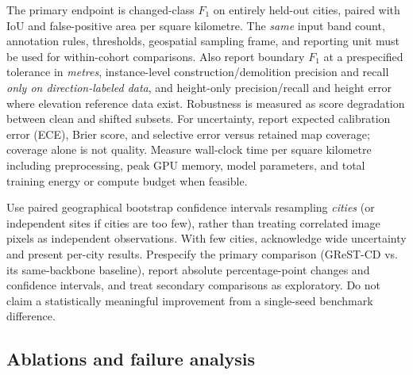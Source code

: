 \documentclass[11pt,a4paper]{article}
\begin{document}
The primary endpoint is changed-class $F_1$ on entirely held-out cities, paired with IoU and false-positive area per square kilometre. The \emph{same} input band count, annotation rules, thresholds, geospatial sampling frame, and reporting unit must be used for within-cohort comparisons. Also report boundary $F_1$ at a prespecified tolerance in \emph{metres}, instance-level construction/demolition precision and recall \emph{only on direction-labeled data}, and height-only precision/recall and height error where elevation reference data exist. Robustness is measured as score degradation between clean and shifted subsets. For uncertainty, report expected calibration error (ECE), Brier score, and selective error versus retained map coverage; coverage alone is not quality. Measure wall-clock time per square kilometre including preprocessing, peak GPU memory, model parameters, and total training energy or compute budget when feasible.

Use paired geographical bootstrap confidence intervals resampling \emph{cities} (or independent sites if cities are too few), rather than treating correlated image pixels as independent observations. With few cities, acknowledge wide uncertainty and present per-city results. Prespecify the primary comparison (GReST-CD vs. its same-backbone baseline), report absolute percentage-point changes and confidence intervals, and treat secondary comparisons as exploratory. Do not claim a statistically meaningful improvement from a single-seed benchmark difference.

\subsection{Ablations and failure analysis}
\end{document}
